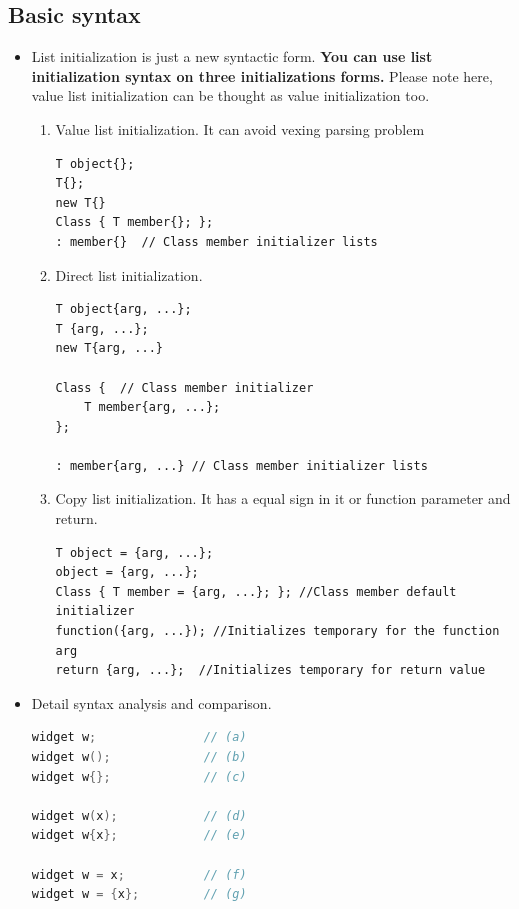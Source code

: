 \documentclass[a4paper,11pt,twoside]{book}
\begin{document}
\subsection{Basic syntax}
\begin{itemize}
		
	\item List initialization is just a new syntactic form. \textbf{You can use list initialization syntax on three initializations forms.} Please note here, value list initialization can be thought as value initialization too.  
	\begin{enumerate}
		\item Value list initialization. It can avoid vexing parsing problem
\begin{lstlisting}[numbers=none]
T object{};
T{};
new T{}
Class { T member{}; };
: member{}  // Class member initializer lists
\end{lstlisting}

		\item Direct list initialization.
\begin{lstlisting}[numbers=none]
T object{arg, ...};
T {arg, ...};
new T{arg, ...}

Class {  // Class member initializer
	T member{arg, ...}; 
};
		
: member{arg, ...} // Class member initializer lists
\end{lstlisting}

		\item Copy list initialization. It has a equal sign in it or function parameter and return.
\begin{lstlisting}
T object = {arg, ...};
object = {arg, ...};
Class { T member = {arg, ...}; }; //Class member default initializer
function({arg, ...}); //Initializes temporary for the function arg
return {arg, ...};  //Initializes temporary for return value
\end{lstlisting}
	\end{enumerate}
		
\item Detail syntax analysis and comparison.
\begin{lstlisting}[frame=single, language=c++,mathescape=true]
widget w;               // (a)
widget w();             // (b)
widget w{};             // (c)
	
widget w(x);            // (d)
widget w{x};            // (e)
	
widget w = x;           // (f)
widget w = {x};         // (g)
	

\end{lstlisting}
\end{itemize}
\end{document}
